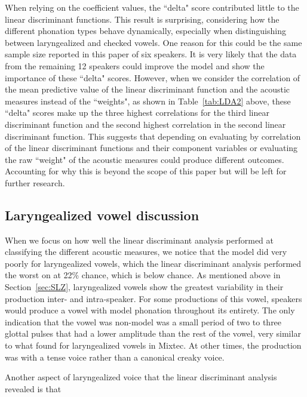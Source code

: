 \documentclass[12pt, letterpaper]{article}
\begin{document}
When relying on the coefficient values, the ``delta" score contributed little to the linear discriminant functions. This result is surprising, considering how the different phonation types behave dynamically, especially when distinguishing between laryngealized and checked vowels. One reason for this could be the same sample size reported in this paper of six speakers. It is very likely that the data from the remaining 12 speakers could improve the model and show the importance of these ``delta" scores. However, when we consider the correlation of the mean predictive value of the linear discriminant function and the acoustic measures instead of the ``weights", as shown in Table~\ref{tab:LDA2} above, these ``delta" scores make up the three highest correlations for the third linear discriminant function and the second highest correlation in the second linear discriminant function. This suggests that depending on evaluating by correlation of the linear discriminant functions and their component variables or evaluating the raw ``weight" of the acoustic measures could produce different outcomes. Accounting for why this is beyond the scope of this paper but will be left for further research. 

\subsection{Laryngealized vowel discussion} \label{sec:DiscussionLaryngealized}

When we focus on how well the linear discriminant analysis performed at classifying the different acoustic measures, we notice that the model did very poorly for laryngealized vowels, which the linear discriminant analysis performed the worst on at 22\% chance, which is below chance. As mentioned above in Section~\ref{sec:SLZ}, laryngealized vowels show the greatest variability in their production inter- and intra-speaker. For some productions of this vowel, speakers would produce a vowel with model phonation throughout its entirety. The only indication that the vowel was non-model was a small period of two to three glottal pulses that had a lower amplitude than the rest of the vowel, very similar to what \citet{gerfenProductionPerceptionLaryngealized2005} found for laryngealized vowels in Mixtec. At other times, the production was with a tense voice rather than a canonical creaky voice. 

Another aspect of laryngealized voice that the linear discriminant analysis revealed is that 
\end{document}
